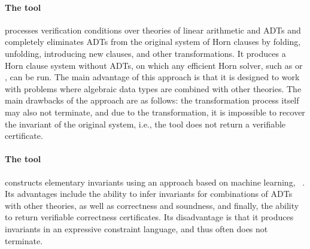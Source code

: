 \paragraph{The \vericat{} tool~\cite{10.1093/logcom/exab090,pettorossi_proietti_2022,10.1007/978-3-030-51074-9_6,angelis_fioravanti_pettorossi_proietti_2018}} processes verification conditions over theories of linear arithmetic and ADTs and completely eliminates ADTs from the original system of Horn clauses by folding, unfolding, introducing new clauses, and other transformations. It produces a Horn clause system without ADTs, on which any efficient Horn solver, such as \spacer{} or \eldarica{}, can be run. The main advantage of this approach is that it is designed to work with problems where algebraic data types are combined with other theories. The main drawbacks of the approach are as follows: the transformation process itself may also not terminate, and due to the transformation, it is impossible to recover the invariant of the original system, i.e., the tool does not return a verifiable certificate.

\paragraph{The \hoice{} tool~\cite{10.1007/978-3-030-02768-1_8}} constructs elementary invariants using an approach based on machine learning, \ice{}~\cite{10.1007/978-3-319-08867-9_5}. Its advantages include the ability to infer invariants for combinations of ADTs with other theories, as well as correctness and soundness, and finally, the ability to return verifiable correctness certificates. Its disadvantage is that it produces invariants in an expressive constraint language, and thus often does not terminate.

